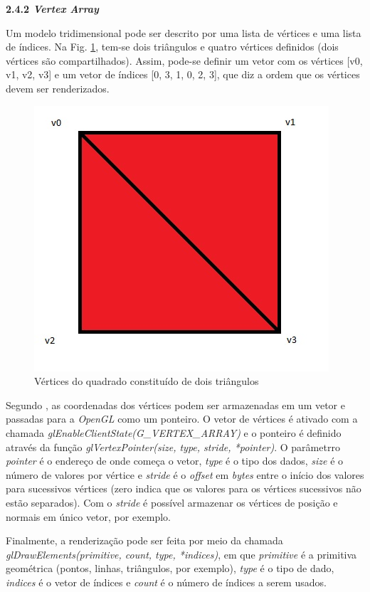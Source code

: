 \begin{description}
	\item \textbf{2.4.2 \textit{Vertex Array}}

	Um modelo tridimensional pode ser descrito por uma lista de vértices e uma lista de índices. Na Fig. \ref{quadrado}, tem-se dois triângulos e quatro vértices definidos (dois vértices são compartilhados). Assim, pode-se definir um vetor com os vértices [v0, v1, v2, v3] e um vetor de índices [0, 3, 1, 0, 2, 3], que diz a ordem que os vértices devem ser renderizados. 

	\begin{figure}[h]
	\centering
		\includegraphics[keepaspectratio=true,scale=0.5]{figuras/quadrado.jpg}
	\caption{Vértices do quadrado constituído de dois triângulos}
	\label{quadrado}
	\end{figure}


	Segundo  \cite{guha2011}, as coordenadas dos vértices podem ser armazenadas em um vetor e passadas para a \textit{OpenGL} como um ponteiro. O vetor de vértices é ativado com a chamada \textit{glEnableClientState(G\_VERTEX\_ARRAY)} e o ponteiro é definido através da função \textit{glVertexPointer(size, type, stride, *pointer)}. O parâmetrro \textit{pointer} é o endereço de onde começa o vetor, \textit{type} é o tipo dos dados, \textit{size} é o número de valores por vértice e \textit{stride} é o \textit{offset} em \textit{bytes} entre o início dos valores para sucessivos vértices (zero indica que os valores para os vértices sucessivos não estão separados). Com o \textit{stride} é possível armazenar os vértices de posição e normais em único vetor, por exemplo. 

	Finalmente, a renderização pode ser feita por meio da chamada \textit{glDrawElements(primitive, count, type, *indices)}, em que \textit{primitive} é a primitiva geométrica (pontos, linhas, triângulos, por exemplo), \textit{type} é o tipo de dado, \textit{indices} é o vetor de índices e \textit{count} é o número de índices a serem usados. 


\end{description}
